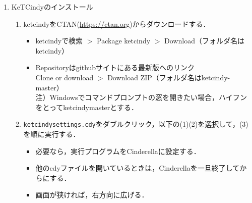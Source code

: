 \documentclass{ujarticle}
\begin{document}
\begin{enumerate}[\bf\large 1.]
\begin{enumerate}[(1)]
\end{enumerate}
 
\item KeTCindyのインストール\vspace{-2mm}
  \begin{enumerate}[(1)]
  \item ketcindyをCTAN(\url{https://ctan.org})からダウンロードする．
    \begin{itemize}
     \item ketcindyで検索 $>$ Package ketcindy $>$ Download（フォルダ名はketcindy）
     \item Repositoryはgithubサイトにある最新版へのリンク\\
        \hspace*{10mm}Clone or download $>$ Download ZIP（フォルダ名はketcindy-master）\\
      \hspace*{5mm}注）Windowsでコマンドプロンプトの窓を開きたい場合，ハイフンをとってketcindymasterとする．     
     \end{itemize}
  \item \verb|ketcindysettings.cdy|をダブルクリック，以下の(1)(2)を選択して，(3)を順に実行する．
    \begin{itemize}
    \item 必要なら，実行プログラムをCinderellaに設定する．
    \item 他のcdyファイルを開いているときは，Cinderellaを一旦終了してからにする．
   \item 画面が狭ければ，右方向に広げる．
   \end{itemize}
  \end{enumerate}



\end{enumerate}
\end{document}

